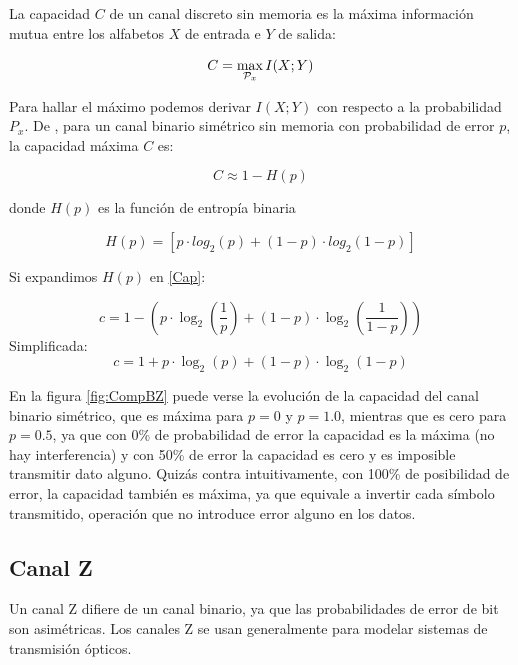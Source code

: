 La capacidad $C$ de un canal discreto sin memoria es la máxima información mutua entre los alfabetos $X$ de entrada e $Y$ de salida:

\begin{equation}
C = \max_{{\cal{P}}_x} I(X;Y) 
\end{equation}

Para hallar el máximo podemos derivar $I(X;Y)$ con respecto a la probabilidad $P_x$.
De \cite{MacKay:2002}, para un canal binario simétrico sin memoria con probabilidad de error $p$, la capacidad máxima $C$ es:

\begin{equation}\label{Cap}
C \approx 1 - H(p) 
\end{equation}

donde $H(p)$ es la función de entropía binaria

\begin{equation}\label{Hp}
 H(p) = [p \cdot log_2(p) + (1-p)\cdot log_2 (1-p)]
\end{equation}

Si expandimos $H(p)$ en \ref{Cap}:

$$ c = 1-\left(p \cdot \log_2\left(\frac{1}{p}\right) + (1-p) \cdot \log_2\left(\frac{1}{1-p}\right)\right) $$
Simplificada:
$$ c = 1 + p \cdot \log_2(p) + (1 - p) \cdot \log_2(1-p) $$

En la figura \ref{fig:CompBZ} puede verse la evolución de la capacidad del canal binario simétrico, que es máxima para $p=0$ y $p=1.0$, mientras que es cero para $p=0.5$, ya que con 0\% de probabilidad de error la capacidad es la máxima (no hay interferencia) y con 50\% de error la capacidad es cero y es imposible transmitir dato alguno. Quizás contra intuitivamente, con 100\% de posibilidad de error, la capacidad también es máxima, ya que equivale a invertir cada símbolo transmitido, operación que no introduce error alguno en los datos.


\subsection{Canal Z}
\label{canalZ}
Un canal Z difiere de un canal binario, ya que las probabilidades de error de bit son asimétricas.
Los canales Z se usan generalmente para modelar sistemas de transmisión ópticos.

